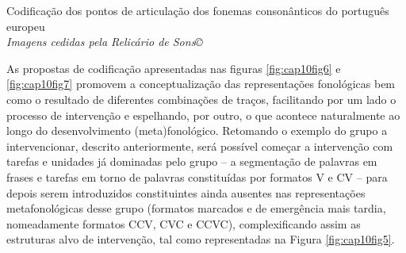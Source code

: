 \documentclass[output=paper,colorlinks,citecolor=brown,booklanguage=portuguese]{langscibook}
\begin{document}
\begin{Tabela}
\caption{{Codificação dos pontos de articulação dos fonemas consonânticos do português europeu}\\
\small{\emph{Imagens cedidas pela Relicário de Sons©}}}
\label{tab:cap10tab4}

\end{Tabela}

As propostas de codificação apresentadas nas figuras \ref{fig:cap10fig6} e \ref{fig:cap10fig7} promovem a conceptualização das representações fonológicas bem como o resultado de diferentes combinações de traços, facilitando por um lado o processo de intervenção e espelhando, por outro, o que acontece naturalmente ao longo do desenvolvimento (meta)fonológico. 
Retomando o exemplo do grupo a intervencionar, descrito anteriormente, será possível começar a intervenção com tarefas e unidades já dominadas pelo grupo – a segmentação de palavras em frases e tarefas em torno de palavras constituídas por formatos V e CV – para depois serem introduzidos constituintes ainda ausentes nas representações metafonológicas desse grupo (formatos marcados e de emergência mais tardia, nomeadamente formatos CCV, CVC e CCVC), complexificando assim as estruturas alvo de intervenção, tal como representadas na Figura \ref{fig:cap10fig5}. 
\end{document}
